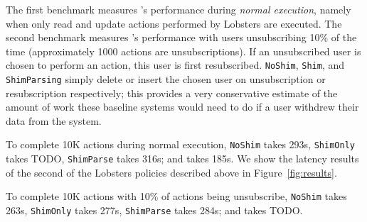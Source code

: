 The first benchmark measures \sys's performance during \emph{normal execution}, namely when only
read and update actions performed by Lobsters are executed.
The second benchmark measures \sys's performance with users unsubscribing 10\% of the time
(approximately 1000 actions are unsubscriptions). If an unsubscribed user is chosen to perform an action, this user is first resubscribed.
\texttt{NoShim}, \texttt{Shim}, and \texttt{ShimParsing} simply delete or insert the chosen user on
unsubscription or resubscription respectively; this provides a very conservative estimate of the
amount of work these baseline systems would need to do if a user withdrew their data from the system.

To complete 10K actions during normal execution, \texttt{NoShim} takes 293s, \texttt{ShimOnly} takes
TODO, \texttt{ShimParse} takes 316s; and \texttt{\sys} takes 185s.
We show the latency results of the second of the Lobsters policies described above in
Figure~\ref{fig:results}.

To complete 10K actions with 10\% of actions being unsubscribe, \texttt{NoShim} takes 263s, \texttt{ShimOnly} takes 277s, \texttt{ShimParse}
takes 284s; and \texttt{\sys} takes TODO.
\fi
